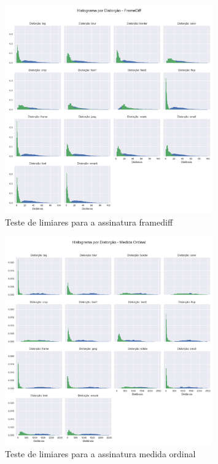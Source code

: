 \begin{figure}[h]
	\centering
	\label{fig:limiares-framediff}
	\caption{Teste de limiares para a assinatura framediff}
	\includegraphics[width=0.8\textwidth]{dados/figuras/experimentos/histograma_distorcao_FrameDiff.png}
\end{figure}
\begin{figure}[h]
	\centering
	\label{fig:limiares-medidaordinal}
	\caption{Teste de limiares para a assinatura medida ordinal}
	\includegraphics[width=0.8\textwidth]{dados/figuras/experimentos/histograma_distorcao_Medida_Ordinal.png}
\end{figure}
